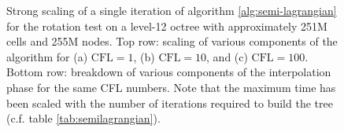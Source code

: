 \begin{figure}[htbp]
\begin{center}
	\end{center}
	\caption{Strong scaling of a single iteration of algorithm \ref{alg:semi-lagrangian} for the rotation test on a level-12 octree with approximately 251M cells and 255M nodes. Top row: scaling of various components of the algorithm for (a) $\text{CFL} = 1$, (b) $\text{CFL} = 10$, and (c) $\text{CFL} = 100$. Bottom row: breakdown of various components of the interpolation phase for the same CFL numbers. Note that the maximum time has been scaled with the number of iterations required to build the tree (c.f. table \ref{tab:semilagrangian}).}
	\label{fig:semilagrangian_large}
\end{figure}

